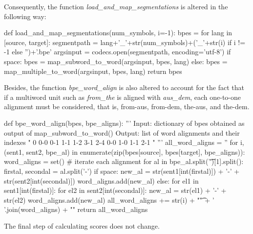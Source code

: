 Consequently, the function \emph{load\_and\_map\_segmentations} is altered in the following way:

\begin{python}
def load_and_map_segmentations(num_symbols, i=-1):
  bpes = {}
  for lang in [source, target]:
    segmentpath = lang+'_'+str(num_symbols)+('_'+str(i) if i != -1 else '')+'.bpe'
    argsinput = codecs.open(segmentpath, encoding='utf-8')
    if space:
        bpes = map_subword_to_word(argsinput, bpes, lang)
    else:
        bpes = map_multiple_to_word(argsinput, bpes, lang)
  return bpes
\end{python}

Besides, the function \emph{bpe\_word\_align} is also altered to account for the fact that if a multiword unit such as \emph{from\_the} is aligned with \emph{aus\_dem}, each one-to-one alignment must be considered, that is, from-aus, from-dem, the-aus, and the-dem.

\begin{python}
def bpe_word_align(bpes, bpe_aligns):
  '''
  Input: dictionary of bpes obtained as output of map_subword_to_word()
  Output: list of word alignments and their indexes
    "
      0   0-0 0-1 1-1 1-2 3-1 2-4    0-0 1-0 1-1 2-1 \n
    "
  '''
  all_word_aligns = ''
  for i, (sent1, sent2, bpe_al) in enumerate(zip(bpes[source], bpes[target], bpe_aligns)):
    word_aligns = set()
    # iterate each alignment
    for al in bpe_al.split('\t')[1].split():
      firstal, secondal = al.split('-')
      if space:
        new_al = str(sent1[int(firstal)]) + '-' + str(sent2[int(secondal)])
        word_aligns.add(new_al)
      else:
        for el1 in sent1[int(firstal)]:
          for el2 in sent2[int(secondal)]:
            new_al = str(el1) + '-' + str(el2)
            word_aligns.add(new_al)
    all_word_aligns += str(i) + "\t" + ' '.join(word_aligns) + "\n"
  return all_word_aligns
\end{python}

The final step of calculating scores does not change.
